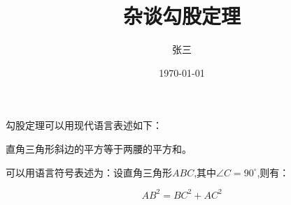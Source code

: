 \documentclass{ctexbook}%
\title{\heiti 杂谈勾股定理}
\author{\kaishu 张三}
\date{\today}
\newcommand{\degree}{^\circ}
\begin{document}
	\maketitle
	勾股定理可以用现代语言表述如下：
	
	直角三角形斜边的平方等于两腰的平方和。
	
	可以用语言符号表述为：设直角三角形$ABC$,其中$ \angle C=90\degree $,则有：
	
	\begin{equation}
		 AB^2=BC^2+AC^2 
	\end{equation}
\end{document}
